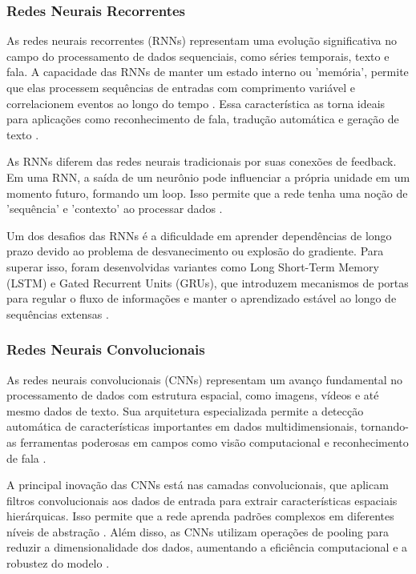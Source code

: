 \documentclass[conference]{IEEEtran}
\begin{document}
\subsubsection{Redes Neurais Recorrentes} As redes neurais recorrentes (RNNs) representam uma 
evolução significativa no campo do processamento de dados sequenciais, 
como séries temporais, texto e fala. A capacidade das RNNs de manter um 
estado interno ou 'memória', permite que elas processem sequências de entradas 
com comprimento variável e correlacionem eventos ao longo do tempo \cite{Graves2013}. 
Essa característica as torna ideais para aplicações como reconhecimento de fala, 
tradução automática e geração de texto \cite{Sutskever2014}.

As RNNs diferem das redes neurais tradicionais por suas conexões de feedback. 
Em uma RNN, a saída de um neurônio pode influenciar a própria unidade em um momento futuro, formando um loop. 
Isso permite que a rede tenha uma noção de 'sequência' e 
'contexto' ao processar dados \cite{Elman1990}.

Um dos desafios das RNNs é a dificuldade em aprender dependências de longo prazo devido ao 
problema de desvanecimento ou explosão do gradiente. 
Para superar isso, foram desenvolvidas variantes como Long Short-Term Memory (LSTM) e 
Gated Recurrent Units (GRUs), que introduzem mecanismos de portas para regular o fluxo de 
informações e manter o aprendizado estável ao longo de sequências extensas \cite{Hochreiter1997, Cho2014}.



\subsubsection{Redes Neurais Convolucionais} As redes neurais convolucionais (CNNs) representam um avanço 
fundamental no processamento de dados com estrutura espacial, como imagens, vídeos e até mesmo dados de texto. 
Sua arquitetura especializada permite a detecção automática de características importantes em dados 
multidimensionais, tornando-as ferramentas poderosas em campos como 
visão computacional e reconhecimento de fala \cite{LeCun2015}.

A principal inovação das CNNs está nas camadas convolucionais, que aplicam filtros convolucionais 
aos dados de entrada para extrair características espaciais hierárquicas. 
Isso permite que a rede aprenda padrões complexos em diferentes níveis de abstração \cite{Krizhevsky2012}. 
Além disso, as CNNs utilizam operações de pooling para reduzir a dimensionalidade dos dados, 
aumentando a eficiência computacional e a robustez do modelo \cite{Goodfellow2016}.
\end{document}
